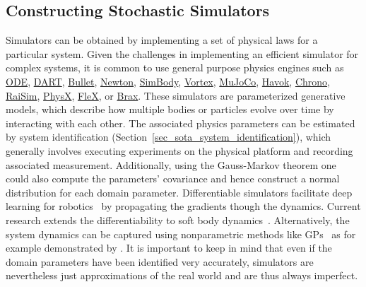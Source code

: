 \documentclass[utf8]{frontiersSCNS} %
\begin{document}
\subsection{Constructing Stochastic Simulators}
\label{sec_sota_simulators}
Simulators can be obtained by implementing a set of physical laws for a particular system.
Given the challenges in implementing an efficient simulator for complex systems, it is common to use general purpose physics engines such as
\href{https://ode.org}{ODE},
\href{https://dartsim.github.io/}{DART},
\href{https://pybullet.org/wordpress/}{Bullet},
\href{http://newtondynamics.com/forum/newton.php}{Newton},
\href{https://simtk.org/projects/simbody}{SimBody},
\href{https://www.cm-labs.com/vortex-studio/}{Vortex},
\href{http://www.mujoco.org/}{MuJoCo},
\href{https://www.havok.com/}{Havok},
\href{https://projectchrono.org/}{Chrono},
\href{https://raisim.com/}{RaiSim},
\href{https://developer.nvidia.com/physx-sdk}{PhysX},
\href{https://developer.nvidia.com/flex}{FleX}, or
\href{https://github.com/google/brax}{Brax}.
These simulators are parameterized generative models, which describe how multiple bodies or particles evolve over time by interacting with each other.
The associated physics parameters can be estimated by system identification (Section~\ref{sec_sota_system_identification}), which generally involves executing experiments on the physical platform and recording associated measurement. 
Additionally, using the Gauss-Markov theorem one could also compute the parameters' covariance and hence construct a normal distribution for each domain parameter. %
Differentiable simulators facilitate deep learning for robotics~\citep{Degrave_Wyffels_19,Coumans_TinyDiffSim,Heiden_Millard_21} by propagating the gradients though the dynamics.
Current research extends the differentiability to soft body dynamics~\citep{Hu_Matusik_19}.
Alternatively, the system dynamics can be captured using nonparametric methods like \acp{GP}~\citep{Rasmussen_Williams_2006} as for example demonstrated by \citet{Calandra_Peters_15}.
It is important to keep in mind that even if the domain parameters have been identified very accurately, simulators are nevertheless just approximations of the real world and are thus always imperfect.
\end{document}
